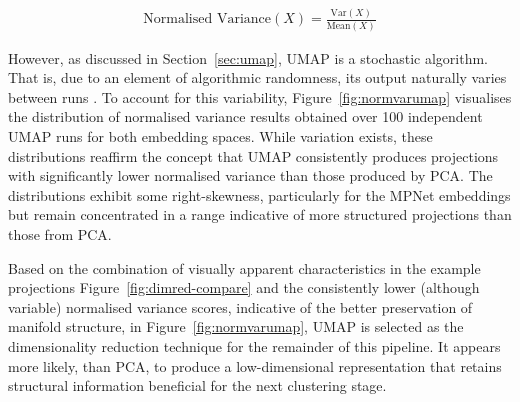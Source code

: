 \documentclass[10pt,oneside]{report}
\begin{document}
\begin{align}
    \text{Normalised Variance}(X) = \frac{\text{Var}(X)}{\text{Mean}(X)}
    \label{eq:normvar}
\end{align}

However, as discussed in Section~\ref{sec:umap}, UMAP is a stochastic algorithm. That is, due to an element of algorithmic randomness, its output naturally varies between runs \cite{mcinnes2018umap}. To account for this variability, Figure~\ref{fig:normvarumap} visualises the distribution of normalised variance results obtained over 100 independent UMAP runs for both embedding spaces. While variation exists, these distributions reaffirm the concept that UMAP consistently produces projections with significantly lower normalised variance than those produced by PCA. The distributions exhibit some right-skewness, particularly for the MPNet embeddings but remain concentrated in a range indicative of more structured projections than those from PCA.

Based on the combination of visually apparent characteristics in the example projections Figure~\ref{fig:dimred-compare} and the consistently lower (although variable) normalised variance scores, indicative of the better preservation of manifold structure, in Figure~\ref{fig:normvarumap}, UMAP is selected as the dimensionality reduction technique for the remainder of this pipeline. It appears more likely, than PCA, to produce a low-dimensional representation that retains structural information beneficial for the next clustering stage. 
\end{document}
